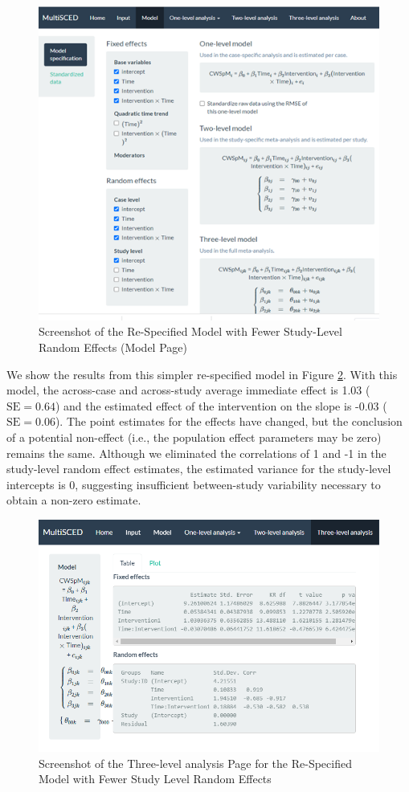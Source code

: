 \documentclass[
]{book}
\begin{document}
\begin{figure}
\includegraphics[width=0.6\linewidth]{images/MultiSCED_model.modelspec_simpler_Lewandowski2011} \caption{Screenshot of the Re-Specified Model with Fewer Study-Level Random Effects (Model Page)}\label{fig:MultiSCED-modelspec-simpler-Lewandowski}
\end{figure}

We show the results from this simpler re-specified model in Figure \ref{fig:MultiSCED-3Level-simpler-Lewandowski}. With this model, the across-case and across-study average immediate effect is 1.03 (\(\text{SE} = 0.64\)) and the estimated effect of the intervention on the slope is -0.03 (\(\text{SE} = 0.06\)). The point estimates for the effects have changed, but the conclusion of a potential non-effect (i.e., the population effect parameters may be zero) remains the same. Although we eliminated the correlations of 1 and -1 in the study-level random effect estimates, the estimated variance for the study-level intercepts is 0, suggesting insufficient between-study variability necessary to obtain a non-zero estimate.

\begin{figure}
\includegraphics[width=0.6\linewidth]{images/MultiSCED_3level_simpler_Lewandowski2011} \caption{Screenshot of the Three-level analysis Page for the Re-Specified Model with Fewer Study Level Random Effects}\label{fig:MultiSCED-3Level-simpler-Lewandowski}
\end{figure}
\end{document}
